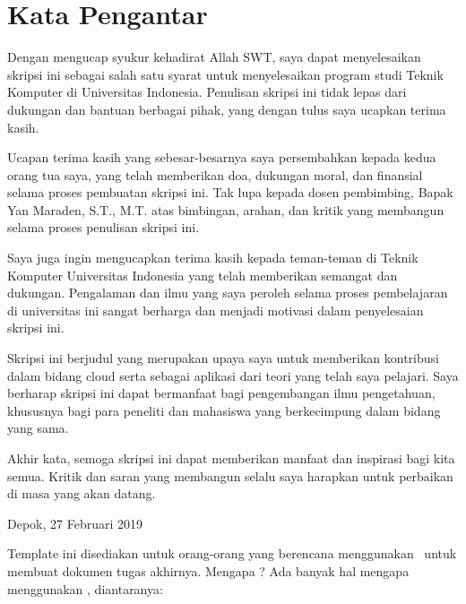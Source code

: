 \chapter*{Kata Pengantar}
Dengan mengucap syukur kehadirat Allah SWT, saya dapat menyelesaikan skripsi ini sebagai salah satu syarat untuk menyelesaikan program studi Teknik Komputer di Universitas Indonesia. Penulisan skripsi ini tidak lepas dari dukungan dan bantuan berbagai pihak, yang dengan tulus saya ucapkan terima kasih.

Ucapan terima kasih yang sebesar-besarnya saya persembahkan kepada kedua orang tua saya, yang telah memberikan doa, dukungan moral, dan finansial selama proses pembuatan skripsi ini. Tak lupa kepada dosen pembimbing, Bapak Yan Maraden, S.T., M.T. atas bimbingan, arahan, dan kritik yang membangun selama proses penulisan skripsi ini.

Saya juga ingin mengucapkan terima kasih kepada teman-teman di Teknik Komputer Universitas Indonesia yang telah memberikan semangat dan dukungan. Pengalaman dan ilmu yang saya peroleh selama proses pembelajaran di universitas ini sangat berharga dan menjadi motivasi dalam penyelesaian skripsi ini.

Skripsi ini berjudul \judul yang merupakan upaya saya untuk memberikan kontribusi dalam bidang cloud serta sebagai aplikasi dari teori yang telah saya pelajari. Saya berharap skripsi ini dapat bermanfaat bagi pengembangan ilmu pengetahuan, khususnya bagi para peneliti dan mahasiswa yang berkecimpung dalam bidang yang sama.

Akhir kata, semoga skripsi ini dapat memberikan manfaat dan inspirasi bagi kita semua. Kritik dan saran yang membangun selalu saya harapkan untuk perbaikan di masa yang akan datang.


\vspace*{0.1cm}
\begin{flushright}
	Depok, 27 Februari 2019\\[0.1cm]
	\vspace*{1cm}
	\penulis
	
\end{flushright}
	
\iffalse
Template ini disediakan untuk orang-orang yang berencana menggunakan 
\latex~untuk membuat dokumen tugas akhirnya. 
Mengapa \latex? 
Ada banyak hal mengapa menggunakan \latex, diantaranya:

